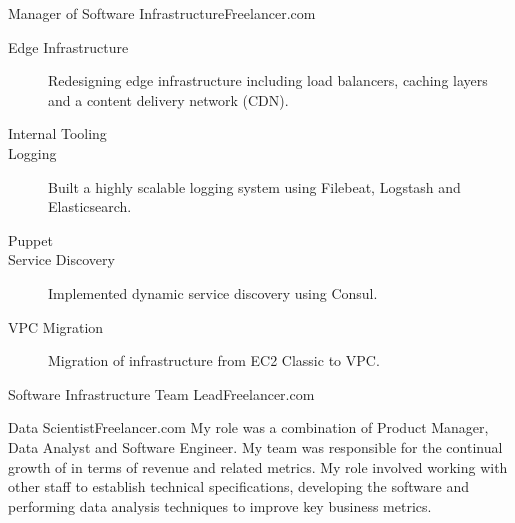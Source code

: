 \begin{professionalExperience}

{Manager of Software Infrastructure}{Freelancer.com}
{
  \begin{description}
    \item[Edge Infrastructure] Redesigning edge infrastructure including load
      balancers, caching layers and a content delivery network (CDN).
    \item[Internal Tooling]
    \item[Logging] Built a highly scalable logging system using Filebeat,
      Logstash and Elasticsearch.
    \item[Puppet]
    \item[Service Discovery] Implemented dynamic service discovery using Consul.
    \item[VPC Migration] Migration of infrastructure from EC2 Classic to VPC.
  \end{description}
}

{Software Infrastructure Team Lead}{Freelancer.com}
{}

{Data Scientist}{Freelancer.com}
{My role was a combination of Product Manager, Data Analyst and Software
Engineer. My team was responsible for the continual growth of
 in terms of revenue and related metrics. My role
involved working with other staff to establish technical specifications,
developing the software and performing data analysis techniques to improve key
business metrics.}

\end{professionalExperience}
